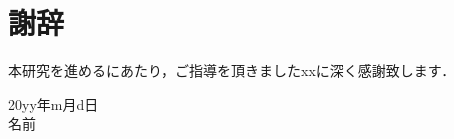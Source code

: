 ﻿  \newcommand{\fulltoday}{\number\day\space \ifcase\month\or
    January\or February\or March\or April\or May\or June\or
    July\or August\or September\or October\or November\or December\fi
    \space\number\year}

\chapter*{謝辞}
本研究を進めるにあたり，ご指導を頂きましたxxに深く感謝致します．

\begin{flushright}
20yy年m月d日\\
名前
\end{flushright}
